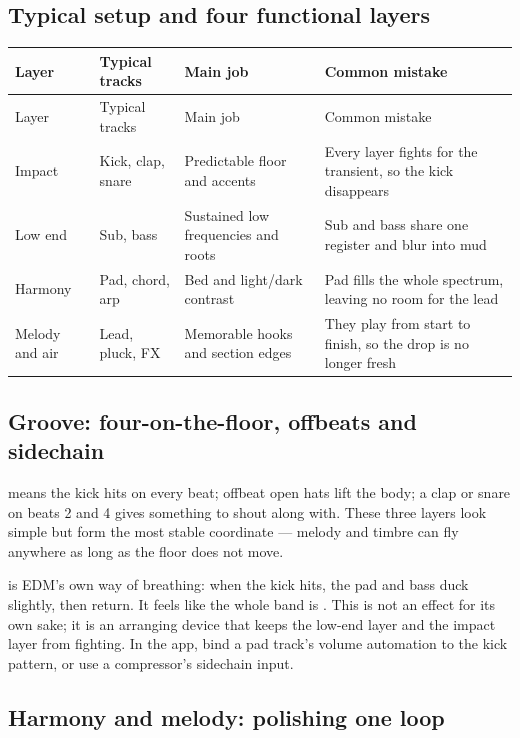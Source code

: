 \subsection{Typical setup and four functional layers}
\label{sec:edm-instrumentation}

\begin{longtable}{p{}p{}p{}p{}}
\toprule
Layer & Typical tracks & Main job & Common mistake \\
\midrule
\endfirsthead
\toprule
Layer & Typical tracks & Main job & Common mistake \\
\midrule
\endhead
Impact & Kick, clap, snare & Predictable floor and accents & Every layer fights for the transient, so the kick disappears \\
Low end & Sub, bass & Sustained low frequencies and roots & Sub and bass share one register and blur into mud \\
Harmony & Pad, chord, arp & Bed and light/dark contrast & Pad fills the whole spectrum, leaving no room for the lead \\
Melody and air & Lead, pluck, FX & Memorable hooks and section edges & They play from start to finish, so the drop is no longer fresh \\
\bottomrule
\end{longtable}

\subsection{Groove: four-on-the-floor, offbeats and sidechain}
\label{sec:edm-groove}

 means the kick hits on every beat; offbeat open hats lift the body; a clap or snare on beats 2 and 4 gives something to shout along with. These three layers look simple but form the most stable coordinate --- melody and timbre can fly anywhere as long as the floor does not move.

 is EDM's own way of breathing: when the kick hits, the pad and bass duck slightly, then return. It feels like the whole band is . This is not an effect for its own sake; it is an arranging device that keeps the low-end layer and the impact layer from fighting. In the app, bind a pad track's volume automation to the kick pattern, or use a compressor's sidechain input.

\subsection{Harmony and melody: polishing one loop}
\label{sec:edm-harmony}

